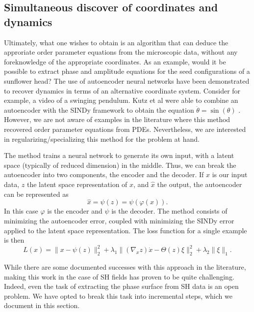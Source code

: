 \documentclass[12pt]{article}
\numberwithin{equation}{section}
\begin{document}
\FloatBarrier

\subsection{Simultaneous discover of coordinates and dynamics}
\par Ultimately, what one wishes to obtain is an algorithm that can deduce the approriate order parameter equations from the microscopic data, without any foreknowledge of the appropriate coordinates. As an example, would it be possible to extract phase and amplitude equations for the seed configurations of a sunflower head? The use of autoencoder neural networks have been demonstrated to recover dynamics in terms of an alternative coordinate system. Consider for example, a video of a swinging pendulum. Kutz et al were able to combine an autoencoder with the SINDy framework to obtain the equation $\ddot{\theta} = \sin(\theta)$ \cite{CHAMP2019}. However, we are not aware of examples in the literature where this method recovered order parameter equations from PDEs. Nevertheless, we are interested in regularizing/specializing this method for the problem at hand.
\par The method trains a neural network to generate its own input, with a latent space (typically of reduced dimension) in the middle. Thus, we can break the autoencoder into two components, the encoder and the decoder. If $x$ is our input data, $z$ the latent space representation of $x$, and $\hat{x}$ the output, the autoencoder can be represented as
\begin{equation}
\hat{x} = \psi(z) = \psi(\varphi(x)).
\end{equation}
In this case $\varphi$ is the encoder and $\psi$ is the decoder. The method consists of minimizing the autoencoder error, coupled with minimizing the SINDy error applied to the latent space representation. The loss function for a single example is then
\begin{equation}
L(x) = \|x - \psi(z)\|_2^2 + \lambda_1\|(\nabla_x z)\dot{x}-\Theta(z)\xi\|_2^2 + \lambda_2\|\xi\|_1.
\end{equation}
\par While there are some documented successes with this approach in the literature, making this work in the case of SH fields has proven to be quite challenging. Indeed, even the task of extracting the phase surface from SH data is an open problem. We have opted to break this task into incremental steps, which we document in this section. 
\end{document}
